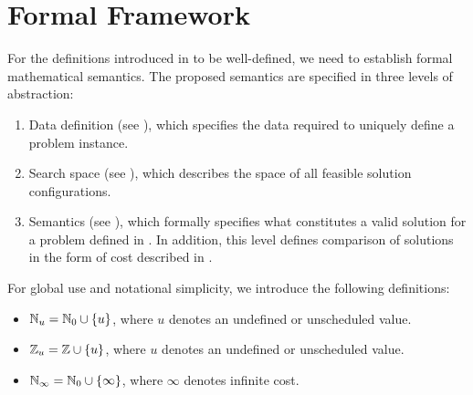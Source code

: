 \cleardoubleoddpage%
\chapter{Formal Framework}
\label{chapter:formal-framework}

For the definitions introduced in  to be well-defined, we need to establish formal mathematical semantics. The proposed semantics are specified in three levels of abstraction:
\begin{enumerate}
      \item Data definition (see ), which specifies the data required to uniquely define a problem instance.
      \item Search space (see ), which describes the space of all feasible solution configurations.
      \item Semantics (see ), which formally specifies what constitutes a valid solution for a problem defined in . In addition, this level defines comparison of solutions in the form of cost described in .
\end{enumerate}

For global use and notational simplicity, we introduce the following definitions:
\begin{itemize}
      \item $\mathbb{N}_u = \mathbb{N}_0 \cup \{ u \}$, where $u$ denotes an undefined or unscheduled value.
      \item $\mathbb{Z}_u = \mathbb{Z} \cup \{ u \}$, where $u$ denotes an undefined or unscheduled value.
      \item $\mathbb{N}_{\infty} = \mathbb{N}_0 \cup \{ \infty \}$, where $\infty$ denotes infinite cost.
\end{itemize}

